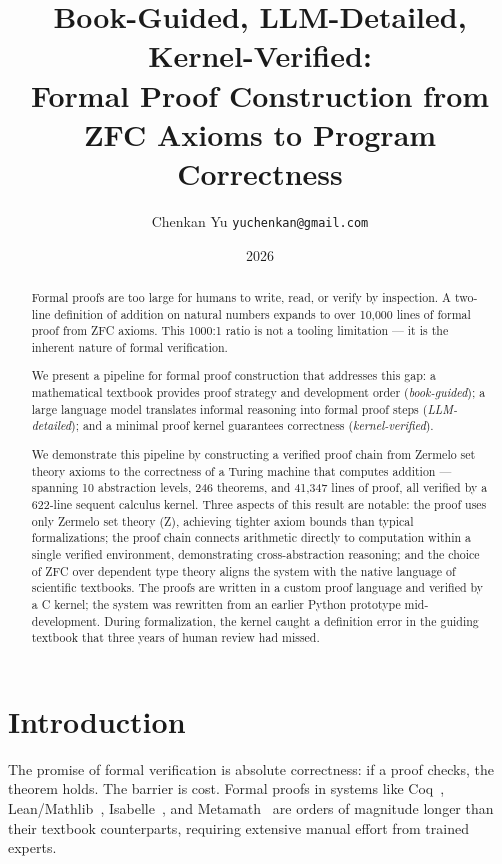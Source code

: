 \documentclass[letterpaper]{article}
\title{Book-Guided, LLM-Detailed, Kernel-Verified:\\
Formal Proof Construction from ZFC Axioms to Program Correctness}
\author{Chenkan Yu \quad \texttt{yuchenkan@gmail.com}}
\date{2026}
\begin{document}
\maketitle
\let\thefootnote\relax{}

\begin{abstract}
Formal proofs are too large for humans to write, read, or verify by inspection.
A two-line definition of addition on natural numbers expands to over 10,000 lines
of formal proof from ZFC axioms. This 1000:1 ratio is not a tooling limitation
--- it is the inherent nature of formal verification.

We present a pipeline for formal proof construction that addresses this gap:
a mathematical textbook provides proof strategy and development order
(\emph{book-guided}); a large language model translates informal reasoning into
formal proof steps (\emph{LLM-detailed}); and a minimal proof kernel guarantees
correctness (\emph{kernel-verified}).

We demonstrate this pipeline by constructing a verified proof chain from
Zermelo set theory axioms to the correctness of a Turing machine that computes
addition --- spanning 10 abstraction levels, 246 theorems, and 41,347 lines
of proof, all verified by a 622-line sequent calculus kernel.
Three aspects of this result are notable: the proof uses only Zermelo set
theory (Z), achieving tighter axiom bounds than typical formalizations;
the proof chain connects arithmetic directly to computation within a single
verified environment, demonstrating cross-abstraction reasoning; and the
choice of ZFC over dependent type theory aligns the system with the native
language of scientific textbooks. The proofs are written in a custom proof language
and verified by a C kernel; the system was rewritten from an earlier Python
prototype mid-development. During formalization, the kernel caught a
definition error in the guiding textbook that three years of human review
had missed.
\end{abstract}

\section{Introduction}
\label{sec:intro}

The promise of formal verification is absolute correctness: if a proof checks,
the theorem holds. The barrier is cost. Formal proofs in systems like
Coq~\citep{coq}, Lean/Mathlib~\citep{mathlib2020}, Isabelle~\citep{isabelle},
and Metamath~\citep{metamath} are orders of magnitude longer than their
textbook counterparts, requiring extensive manual effort from trained experts.
\end{document}
